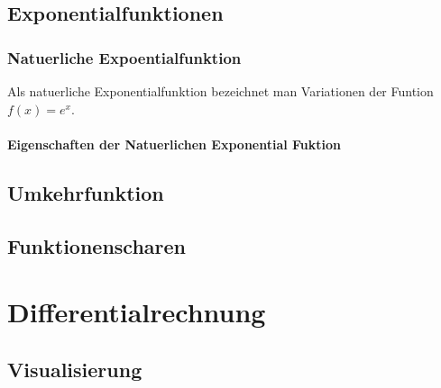 \documentclass[a4paper]{article} %
\begin{document}
		\subsection{Exponentialfunktionen}
		\subsubsection{Natuerliche Expoentialfunktion}
		Als natuerliche Exponentialfunktion bezeichnet man Variationen der Funtion $f(x)=e^x$.
		\paragraph{Eigenschaften der Natuerlichen Exponential Fuktion}
		\subsection{Umkehrfunktion}
		\subsection{Funktionenscharen}
	\newpage
	\section{Differentialrechnung}
	\subsection{Visualisierung}
	
\end{document}
